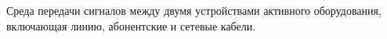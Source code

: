 Среда передачи сигналов между двумя устройствами активного
оборудования, включающая линию, абонентские и сетевые кабели.